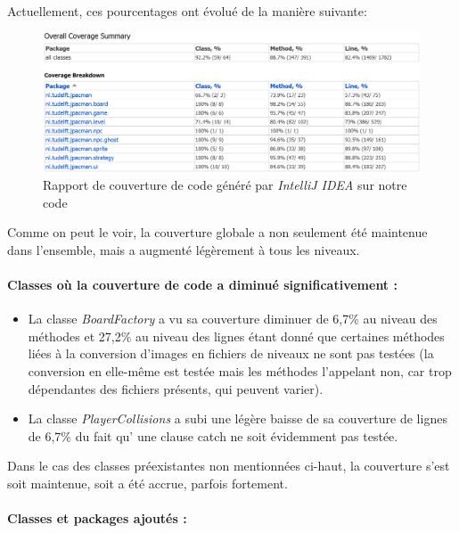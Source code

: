 \documentclass[12pt, openany]{report}
\begin{document}
Actuellement, ces pourcentages ont évolué de la manière suivante:

\begin{figure}[!h]
	\centering
	\includegraphics[width=\textwidth]{Images/MergedCoverage}
	\caption{\label{MergedCoverage} Rapport de couverture de code généré par \textit{IntelliJ IDEA} sur notre code}
\end{figure}

\newpage
Comme on peut le voir, la couverture globale a non seulement été maintenue dans l'ensemble, mais a augmenté légèrement à tous les niveaux.

\paragraph{Classes où la couverture de code a diminué significativement : }

\begin{itemize}
	\item La classe \mbox{\textit{BoardFactory}} a vu sa couverture diminuer de 6,7\% au niveau des méthodes et 27,2\% au niveau des lignes étant donné que certaines méthodes liées à la conversion d'images en fichiers de niveaux ne sont pas testées (la conversion en elle-même est testée mais les méthodes l'appelant non, car trop dépendantes des fichiers présents, qui peuvent varier).
	\item La classe \mbox{\textit{PlayerCollisions}} a subi une légère baisse de sa couverture de lignes de 6,7\% du fait qu' une clause \og catch \fg ne soit évidemment pas testée.
\end{itemize}

Dans le cas des classes préexistantes non mentionnées ci-haut, la couverture s'est soit maintenue, soit a été accrue, parfois fortement.

\paragraph{Classes et packages ajoutés : }
\end{document}
